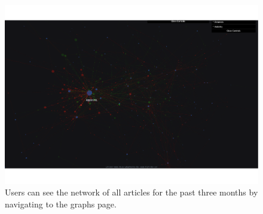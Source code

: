 \begin{figure}[ht]
    \centering
    \includegraphics[width=\textwidth]{img/user/graphs-a.pdf}
    \caption{Users can see the network of all articles for the past three months by navigating to the graphs page.}
    \label{fig:user-documentation-graphs}
\end{figure}

